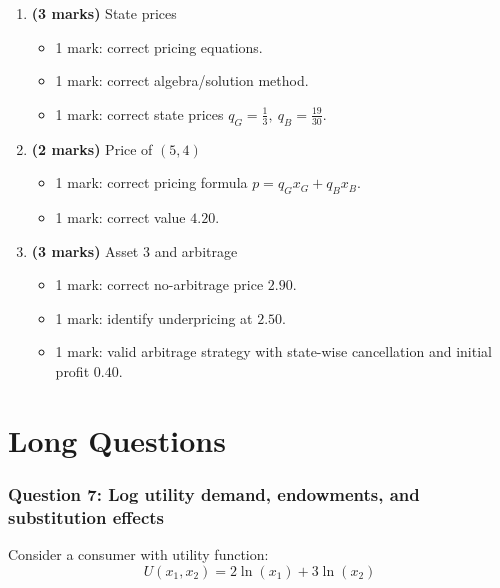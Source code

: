 \documentclass[12pt]{article}
\begin{document}
\begin{enumerate}[label=(\alph*)]
\item \textbf{(3 marks)} State prices
\begin{itemize}
\item 1 mark: correct pricing equations.
\item 1 mark: correct algebra/solution method.
\item 1 mark: correct state prices \(\boxed{q_G=\frac13,\ q_B=\frac{19}{30}}\).
\end{itemize}

\item \textbf{(2 marks)} Price of \((5,4)\)
\begin{itemize}
\item 1 mark: correct pricing formula \(p=q_Gx_G+q_Bx_B\).
\item 1 mark: correct value \(\boxed{4.20}\).
\end{itemize}

\item \textbf{(3 marks)} Asset 3 and arbitrage
\begin{itemize}
\item 1 mark: correct no-arbitrage price \(\boxed{2.90}\).
\item 1 mark: identify underpricing at \(2.50\).
\item 1 mark: valid arbitrage strategy with state-wise cancellation and initial profit \(\boxed{0.40}\).
\end{itemize}
\end{enumerate}



\newpage
\part{Long Questions}

\section*{Question 7: Log utility demand, endowments, and substitution effects}

Consider a consumer with utility function:
\[
U(x_1, x_2) = 2\ln(x_1) + 3\ln(x_2)
\]
\end{document}
